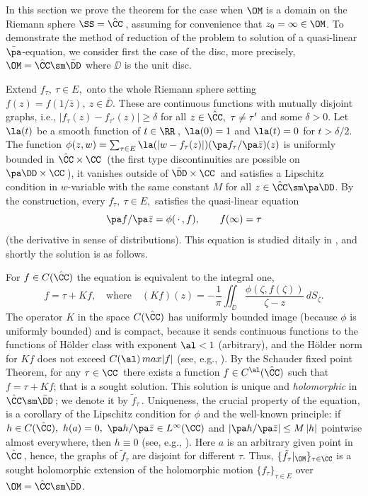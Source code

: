 \bigpagebreak {} In this section we prove the theorem
for the case when $\OM$ is a domain on the Riemann sphere $\SS=\hat\CC\,$,
assuming for convenience that $z_0=\infty\in\OM$.
To demonstrate the method of reduction of the problem to solution of a
quasi-linear $\bar\pa$-equation, we consider first the case of the disc,
more precisely, $\OM=\hat\CC\sm\bar\DD$ where $\DD$ is the unit disc.

Extend $f_\tau,\ \tau\in E,$ onto the whole Riemann sphere
setting $f(z)=f(1/\bar z),\ z\in\bar\DD$.
These are continuous functions with mutually disjoint graphs, i.e.,
$|f_\tau(z)-f_{\tau'}(z)|\ge\delta$ for all $z\in\hat\CC,\ \tau\not=\tau'$
and some $\delta>0$.
Let $\la(t)$ be a smooth function of $t\in\RR\,$, $\la(0)=1$ and $\la(t)=0$
for $t>\delta /2$.
The function $\phi(z,w)=\sum_{\tau\in E}\la(|w-f_\tau(z)|)(\pa
f_\tau/\pa\bar z)(z)$ is uniformly bounded in $\hat\CC\times\CC\,$
(the first type discontinuities are possible on $\pa\DD\times\CC\,$), it
vanishes outside of $\bar\DD\times\CC\,$ and satisfies a Lipschitz condition
in $w$-variable with the same constant $M$ for all $z\in\hat\CC\sm\pa\DD$.
By the construction, every $f_\tau,\ \tau\in E,$ satisfies the quasi-linear
equation
$$
\pa f/\pa\bar z =\phi (\,\cdot\,, f),\qquad f(\infty)=\tau
$$
(the derivative in sense of distributions).
This equation is studied ditaily in \cite{CR}, and shortly the solution is
as follows.

For $f\in C(\hat\CC)$ the equation is equivalent to the integral one,
$$
f=\tau+Kf,\quad \text{where}\quad
(Kf)(z)=-\frac{1}{\pi}\iint_\DD\frac{\phi(\zeta,f(\zeta))}{\zeta-z}\,dS_\zeta.
$$
The operator $K$ in the space $C(\hat\CC)$ has uniformly bounded image
(because $\phi$ is uniformly bounded)
and is compact, because it sends continuous functions to the functions of
H\"older class with exponent
$\al<1$ (arbitrary), and the H\"older norm for $Kf$ does not exceed
$C(\al)\,max |f|$ (see, e.g., \cite{V}).
By the Schauder fixed point Theorem,
for any $\tau\in\CC\,$ there exists a function $f\in C^\al(\hat\CC)$
such that $f=\tau+Kf$; that is a sought solution.
This solution is unique and {\it holomorphic} in $\hat\CC\sm\bar\DD\,$;
we denote it by $\tilde f_\tau\,$.
Uniqueness, the crucial property of the equation, is a corollary of
the Lipschitz condition for $\phi$ and the well-known principle:
if $h\in C(\hat\CC),\ h(a)=0,\ \pa h/\pa\bar z\in L^\infty (\CC)$ and
$|\pa h/\pa\bar z|\le M\,|h|$ pointwise almost everywhere, then
$h\equiv 0$ (see, e.g., \cite{CR}).
Here $a$ is an arbitrary given point in $\hat\CC\,$, hence, the graphs
of $\tilde f_\tau$ are disjoint for different $\tau$.
Thus, $\{\tilde f_\tau |_\OM\}_{\tau\in\CC}$ is a sought holomorphic
extension of the holomorphic motion
$\{f_\tau\}_{\tau\in E}$ over $\OM=\hat\CC\sm\bar\DD$.
\medskip

